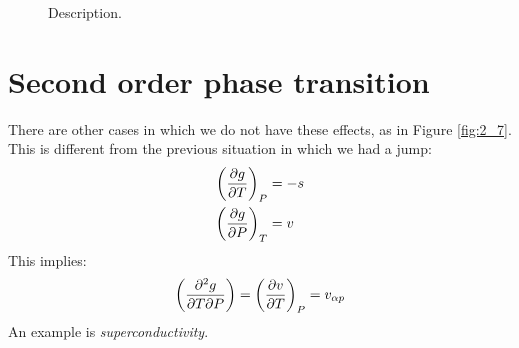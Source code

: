 \documentclass[../main/main.tex]{subfiles}
\begin{document}
\begin{figure}[h!]

\caption{\label{fig:2_6} Description.}
\end{figure}

\section{Second order phase transition}
There are other cases in which we do not have these effects, as in Figure \ref{fig:2_7}. This is different from the previous situation in which we had a jump:
\begin{subequations}
\begin{align}
  \qty(\pdv{g}{T} )_P &= -s \\
  \qty(\pdv{g}{P} )_T &= v
\end{align}
\label{}
\end{subequations}
This implies:
\begin{equation}
  \qty(\pdv{g}{T}{P}  ) = \qty(\pdv{v}{T} )_P = v_{\alpha p}
  \label{eq:}
\end{equation}
An example is \emph{superconductivity}.
\end{document}
